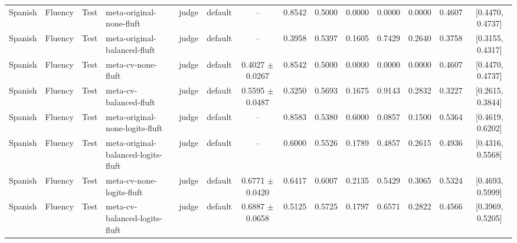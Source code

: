 \begin{tabular}{llllllcccccccc}
Spanish & Fluency & Test & meta-original-none-fluft & judge & default & -- & 0.8542 & 0.5000 & 0.0000 & 0.0000 & 0.0000 & 0.4607 & [0.4470, 0.4737] \\
Spanish & Fluency & Test & meta-original-balanced-fluft & judge & default & -- & 0.3958 & 0.5397 & 0.1605 & 0.7429 & 0.2640 & 0.3758 & [0.3155, 0.4317] \\
Spanish & Fluency & Test & meta-cv-none-fluft & judge & default & 0.4027 $\pm$ 0.0267 & 0.8542 & 0.5000 & 0.0000 & 0.0000 & 0.0000 & 0.4607 & [0.4470, 0.4737] \\
Spanish & Fluency & Test & meta-cv-balanced-fluft & judge & default & 0.5595 $\pm$ 0.0487 & 0.3250 & 0.5693 & 0.1675 & 0.9143 & 0.2832 & 0.3227 & [0.2615, 0.3844] \\
Spanish & Fluency & Test & meta-original-none-logits-fluft & judge & default & -- & 0.8583 & 0.5380 & 0.6000 & 0.0857 & 0.1500 & 0.5364 & [0.4619, 0.6202] \\
Spanish & Fluency & Test & meta-original-balanced-logits-fluft & judge & default & -- & 0.6000 & 0.5526 & 0.1789 & 0.4857 & 0.2615 & 0.4936 & [0.4316, 0.5568] \\
Spanish & Fluency & Test & meta-cv-none-logits-fluft & judge & default & 0.6771 $\pm$ 0.0420 & 0.6417 & 0.6007 & 0.2135 & 0.5429 & 0.3065 & 0.5324 & [0.4693, 0.5999] \\
Spanish & Fluency & Test & meta-cv-balanced-logits-fluft & judge & default & 0.6887 $\pm$ 0.0658 & 0.5125 & 0.5725 & 0.1797 & 0.6571 & 0.2822 & 0.4566 & [0.3969, 0.5205] \\
\hline
\end{tabular}
